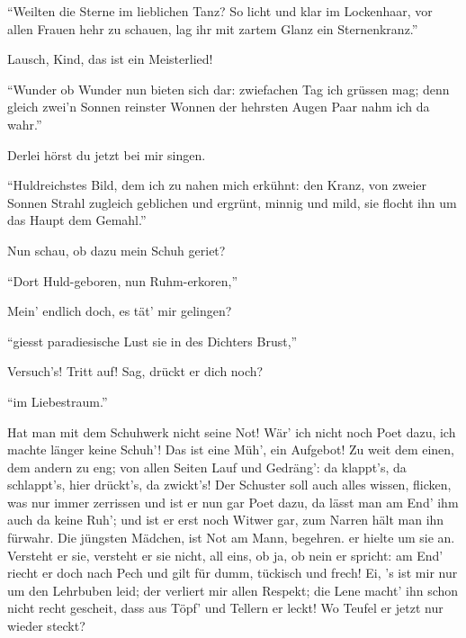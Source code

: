 \begin{drama}
\Waltherspeaks


``Weilten die Sterne im lieblichen Tanz?
So licht und klar im Lockenhaar,
vor allen Frauen hehr zu schauen,
lag ihr mit zartem Glanz ein Sternenkranz.''

\Sachsspeaks


Lausch, Kind, das ist ein Meisterlied!

\Waltherspeaks
``Wunder ob Wunder nun bieten sich dar:
zwiefachen Tag ich grüssen mag;
denn gleich zwei'n Sonnen reinster Wonnen
der hehrsten Augen Paar nahm ich da wahr.''

\Sachsspeaks


Derlei hörst du jetzt bei mir singen.

\Waltherspeaks
``Huldreichstes Bild,
dem ich zu nahen mich erkühnt:
den Kranz, von zweier Sonnen Strahl
zugleich geblichen und ergrünt,
minnig und mild,
sie flocht ihn um das Haupt dem Gemahl.''

\Sachsspeaks


Nun schau, ob dazu mein Schuh geriet?

\Waltherspeaks
``Dort Huld-geboren, nun Ruhm-erkoren,''

\Sachsspeaks
Mein' endlich doch,
es tät' mir gelingen?

\Waltherspeaks
``giesst paradiesische Lust sie in des Dichters Brust,''

\Sachsspeaks
Versuch's! Tritt auf! Sag, drückt er dich noch?

\Waltherspeaks
``im Liebestraum.''


\Sachsspeaks
Hat man mit dem Schuhwerk nicht seine Not!
Wär' ich nicht noch Poet dazu,
ich machte länger keine Schuh'!
Das ist eine Müh', ein Aufgebot!
Zu weit dem einen, dem andern zu eng;
von allen Seiten Lauf und Gedräng':
da klappt's, da schlappt's,
hier drückt's, da zwickt's!
Der Schuster soll auch alles wissen,
flicken, was nur immer zerrissen
und ist er nun gar Poet dazu,
da lässt man am End' ihm auch da keine Ruh';
und ist er erst noch Witwer gar,
zum Narren hält man ihn fürwahr.
Die jüngsten Mädchen, ist Not am Mann,
begehren. er hielte um sie an.
Versteht er sie, versteht er sie nicht,
all eins, ob ja, ob nein er spricht:
am End' riecht er doch nach Pech
und gilt für dumm, tückisch und frech!
Ei, 's ist mir nur um den Lehrbuben leid;
der verliert mir allen Respekt;
die Lene macht' ihn schon nicht recht gescheit,
dass aus Töpf' und Tellern er leckt!
Wo Teufel er jetzt nur wieder steckt?


\end{drama}
